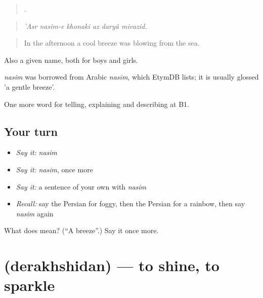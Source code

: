 \begin{quote}
     .
\end{quote}

\begin{quote}
\emph{'Asr nasim-e khonaki az daryâ mivazid.}
\end{quote}

\begin{quote}
In the afternoon a cool breeze was blowing from the sea.
\end{quote}

Also a given name, both for boys and girls.

\begin{cousinweb}
\emph{nasim} was borrowed from Arabic \emph{nasīm}, which EtymDB lists; it is usually glossed 'a gentle breeze'.
\end{cousinweb}

\begin{grammarlens}[title={What you've built}]
One more word for telling, explaining and describing at B1.
\end{grammarlens}

\subsection*{Your turn}
\begin{itemize}
\raggedright
  \item \emph{Say it:} \emph{nasim}
  \item \emph{Say it:} \emph{nasim}, once more
  \item \emph{Say it:} a sentence of your own with \emph{nasim}
  \item \emph{Recall:} say the Persian for foggy, then the Persian for a rainbow, then say \emph{nasim} again
\end{itemize}

\begin{tcolorbox}[breakable,colback=teal!4,colframe=teal!35!black,title={Before you move on}]
What does  mean? (\textquotedblleft{}A breeze\textquotedblright{}.) Say it once more.
\end{tcolorbox}
\section[\texorpdfstring{\fa{درخشیدن} (derakhshidan)}{درخشیدن (derakhshidan)}]{ (derakhshidan) — to shine, to sparkle}

\label{lesson:FA-C479-derakhshidan}



